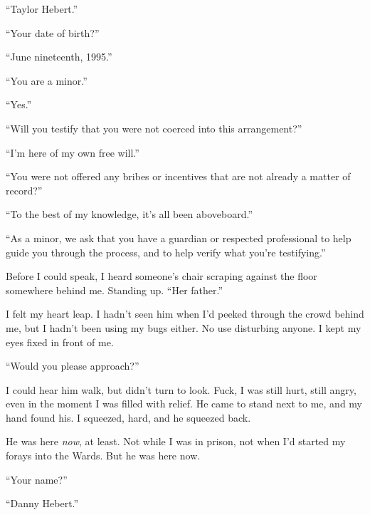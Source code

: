 ``Taylor Hebert.''



``Your date of birth?''



``June nineteenth, 1995.''



``You are a minor.''



``Yes.''



``Will you testify that you were not coerced into this arrangement?''



``I'm here of my own free will.''



``You were not offered any bribes or incentives that are not already a matter of record?''



``To the best of my knowledge, it's all been aboveboard.''



``As a minor, we ask that you have a guardian or respected professional to help guide you through the process, and to help verify what you're testifying.''



Before I could speak, I heard someone's chair scraping against the floor somewhere behind me.  Standing up.  ``Her father.''



I felt my heart leap.  I hadn't seen him when I'd peeked through the crowd behind me, but I hadn't been using my bugs either.  No use disturbing anyone.  I kept my eyes fixed in front of me.



``Would you please approach?''



I could hear him walk, but didn't turn to look.  Fuck, I was still hurt, still angry, even in the moment I was filled with relief.  He came to stand next to me, and my hand found his.  I squeezed, hard, and he squeezed back.



He was here \emph{now}, at least.  Not while I was in prison, not when I'd started my forays into the Wards.  But he was here now.



``Your name?''



``Danny Hebert.''



